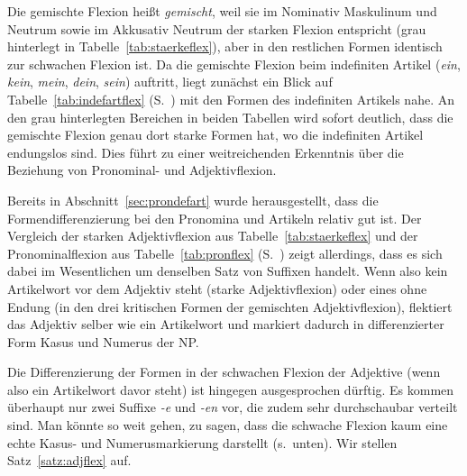 Die gemischte Flexion heißt \textit{gemischt}, weil sie im Nominativ Maskulinum und Neutrum sowie im Akkusativ Neutrum der starken Flexion entspricht (grau hinterlegt in Tabelle~\ref{tab:staerkeflex}), aber in den restlichen Formen identisch zur schwachen Flexion ist.
Da die gemischte Flexion beim indefiniten Artikel (\textit{ein}, \textit{kein}, \textit{mein}, \textit{dein}, \textit{sein}) auftritt, liegt zunächst ein Blick auf Tabelle~\ref{tab:indefartflex} (S.~\pageref{tab:indefartflex}) mit den Formen des indefiniten Artikels nahe.
An den grau hinterlegten Bereichen in beiden Tabellen wird sofort deutlich, dass die gemischte Flexion genau dort starke Formen hat, wo die indefiniten Artikel endungslos sind.
Dies führt zu einer weitreichenden Erkenntnis über die Beziehung von Pronominal- und Adjektivflexion.

Bereits in Abschnitt~\ref{sec:prondefart} wurde herausgestellt, dass die Formendifferenzierung bei den Pronomina und Artikeln relativ gut ist.
Der Vergleich der starken Adjektivflexion aus Tabelle~\ref{tab:staerkeflex} und der Pronominalflexion aus Tabelle~\ref{tab:pronflex} (S.~\pageref{tab:pronflex}) zeigt allerdings, dass es sich dabei im Wesentlichen um denselben Satz von Suffixen handelt.
Wenn also kein Artikelwort vor dem Adjektiv steht (starke Adjektivflexion) oder eines ohne Endung (in den drei kritischen Formen der gemischten Adjektivflexion), flektiert das Adjektiv selber wie ein Artikelwort und markiert dadurch in differenzierter Form Kasus und Numerus der NP.

Die Differenzierung der Formen in der schwachen Flexion der Adjektive (wenn also ein Artikelwort davor steht) ist hingegen ausgesprochen dürftig.
Es kommen überhaupt nur zwei Suffixe \textit{-e} und \textit{-en} vor, die zudem sehr durchschaubar verteilt sind.
Man könnte so weit gehen, zu sagen, dass die schwache Flexion kaum eine echte Kasus- und Numerusmarkierung darstellt (s.\ unten).
Wir stellen Satz~\ref{satz:adjflex} auf.




